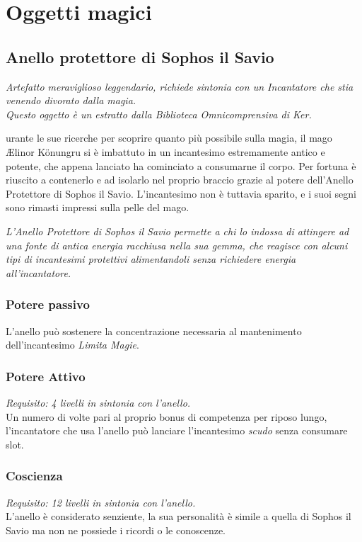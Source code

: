 
\chapter{Oggetti magici}

\section{Anello protettore di Sophos il Savio}

\textit{Artefatto meraviglioso leggendario, richiede sintonia con un Incantatore che stia venendo divorato dalla magia. \\ Questo oggetto è un estratto dalla Biblioteca Omnicomprensiva di Ker.}

urante le sue ricerche per scoprire quanto più possibile sulla magia, il mago Ælinor Könungru si è imbattuto in un incantesimo estremamente antico e potente, che appena lanciato ha cominciato a consumarne il corpo. Per fortuna è riuscito a contenerlo e ad isolarlo nel proprio braccio grazie al potere dell'Anello Protettore di Sophos il Savio. L'incantesimo non è tuttavia sparito, e i suoi segni sono rimasti impressi sulla pelle del mago.

\begin{DndReadAloud}
  \it
  L'Anello Protettore di Sophos il Savio permette a chi lo indossa di attingere ad una fonte di antica energia racchiusa nella sua gemma, che reagisce con alcuni tipi di incantesimi protettivi alimentandoli senza richiedere energia all'incantatore.
\end{DndReadAloud}

\subsection{Potere passivo}
L'anello può sostenere la concentrazione necessaria al mantenimento dell'incantesimo \textit{Limita Magie}. 

\subsection{Potere Attivo}
\textit{Requisito: 4 livelli in sintonia con l'anello.}\\
Un numero di volte pari al proprio bonus di competenza per riposo lungo, l'incantatore che usa l'anello può lanciare l'incantesimo \textit{scudo} senza consumare slot.

\subsection{Coscienza}
\textit{Requisito: 12 livelli in sintonia con l'anello.}\\
L'anello è considerato senziente, la sua personalità è simile a quella di Sophos il Savio ma non ne possiede i ricordi o le conoscenze.

